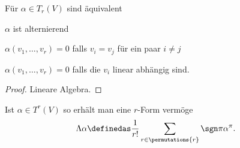 \begin{lemma}
Für \( \alpha\in T_r(V) \) sind äquivalent \begin{eigenschaftenenumerate}
    \item \( \alpha \) ist alternierend
    \item \( \alpha(v_1,\ldots ,v_r) =0 \) falls \( v_i=v_j \) für ein paar \( i \neq j \)
    \item \( \alpha(v_1,\ldots ,v_r)=0 \) falls die \( v_i \) linear abhängig sind.
\end{eigenschaftenenumerate}
\end{lemma}

\begin{proof}
Lineare Algebra.
\end{proof}

\begin{bemerkung*}
Ist \( \alpha\in T^r(V) \) so erhält man eine \( r \)-Form vermöge 
\begin{equation*}
    \Lambda\alpha\definedas \frac{1}{r!} \sum_{r\in \permutations{r}}\sgn\pi\alpha^\pi.
\end{equation*}
\end{bemerkung*}


